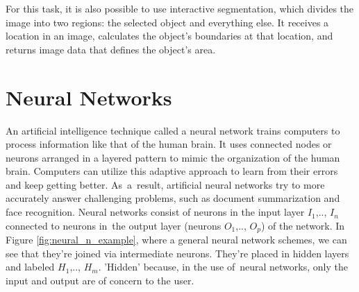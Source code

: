 For this task, it is also possible to use interactive segmentation, which divides the image into two regions: the selected object and everything else. It receives a location in an image, calculates the object's boundaries at that location, and returns image data that defines the object's area.


\section{Neural Networks}
An artificial intelligence technique called a neural network trains computers to process information like that of the human brain. It uses connected nodes or neurons arranged in a layered pattern to mimic the organization of the human brain. Computers can utilize this adaptive approach to learn from their errors and keep getting better. As~a~result, artificial neural networks try to more accurately answer challenging problems, such as document summarization and face recognition.
\newline Neural networks consist of neurons in the input layer $I_1$,.., $I_n$ connected to neurons in~the output layer (neurons $O_1$,.., $O_p$) of the network. In Figure \ref{fig:neural_n_example}, where a general neural network schemes, we can see that they're joined via intermediate neurons. They're placed in hidden layers and labeled $H_1$,.., $H_m$. 'Hidden' because, in the use of~neural networks, only the input and output are of concern to the user. 



